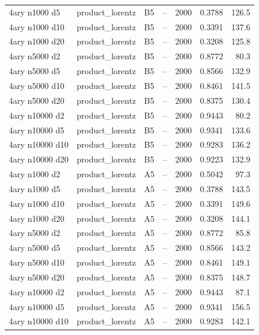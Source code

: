 \begin{longtable}{llllrrr}
\rowcolor{oursbg}
4ary n1000 d5 & product\_lorentz & B5 & -- & 2000 & 0.3788 & 126.5 \\
\rowcolor{oursbg}
4ary n1000 d10 & product\_lorentz & B5 & -- & 2000 & 0.3391 & 137.6 \\
\rowcolor{oursbg}
4ary n1000 d20 & product\_lorentz & B5 & -- & 2000 & 0.3208 & 125.8 \\
\rowcolor{oursbg}
4ary n5000 d2 & product\_lorentz & B5 & -- & 2000 & 0.8772 & 80.3 \\
\rowcolor{oursbg}
4ary n5000 d5 & product\_lorentz & B5 & -- & 2000 & 0.8566 & 132.9 \\
\rowcolor{oursbg}
4ary n5000 d10 & product\_lorentz & B5 & -- & 2000 & 0.8461 & 141.5 \\
\rowcolor{oursbg}
4ary n5000 d20 & product\_lorentz & B5 & -- & 2000 & 0.8375 & 130.4 \\
\rowcolor{oursbg}
4ary n10000 d2 & product\_lorentz & B5 & -- & 2000 & 0.9443 & 80.2 \\
\rowcolor{oursbg}
4ary n10000 d5 & product\_lorentz & B5 & -- & 2000 & 0.9341 & 133.6 \\
\rowcolor{oursbg}
4ary n10000 d10 & product\_lorentz & B5 & -- & 2000 & 0.9283 & 136.2 \\
\rowcolor{oursbg}
4ary n10000 d20 & product\_lorentz & B5 & -- & 2000 & 0.9223 & 132.9 \\
4ary n1000 d2 & product\_lorentz & A5 & -- & 2000 & 0.5042 & 97.3 \\
4ary n1000 d5 & product\_lorentz & A5 & -- & 2000 & 0.3788 & 143.5 \\
4ary n1000 d10 & product\_lorentz & A5 & -- & 2000 & 0.3391 & 149.6 \\
4ary n1000 d20 & product\_lorentz & A5 & -- & 2000 & 0.3208 & 144.1 \\
4ary n5000 d2 & product\_lorentz & A5 & -- & 2000 & 0.8772 & 85.8 \\
4ary n5000 d5 & product\_lorentz & A5 & -- & 2000 & 0.8566 & 143.2 \\
4ary n5000 d10 & product\_lorentz & A5 & -- & 2000 & 0.8461 & 149.1 \\
4ary n5000 d20 & product\_lorentz & A5 & -- & 2000 & 0.8375 & 148.7 \\
4ary n10000 d2 & product\_lorentz & A5 & -- & 2000 & 0.9443 & 87.1 \\
4ary n10000 d5 & product\_lorentz & A5 & -- & 2000 & 0.9341 & 156.5 \\
4ary n10000 d10 & product\_lorentz & A5 & -- & 2000 & 0.9283 & 142.1 \\

\end{longtable}
